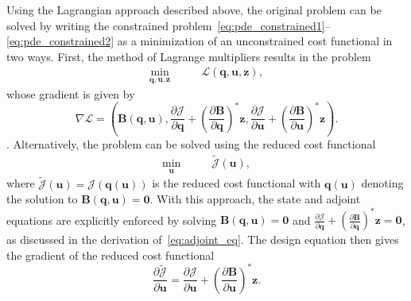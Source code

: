 Using the Lagrangian approach described above, the original problem can be solved by writing the constrained problem~\eqref{eq:pde_constrained1}--\eqref{eq:pde_constrained2} as a minimization of an unconstrained cost functional in two ways. First, the method of Lagrange multipliers results in the problem
\begin{align}
\underset{\mathbf{q}, \mathbf{u}, \mathbf{z}}{\textrm{min}} &\qquad \mathcal{L}(\mathbf{q},\mathbf{u}, \mathbf{z}),
\end{align}
whose gradient is given by
\begin{equation}
\nabla \mathcal{L} = \left(\mathbf{B}(\mathbf{q}, \mathbf{u}), \frac{\partial \mathcal{J}}{\partial \mathbf{q}} + \left(  \frac{\partial \mathbf{B}}{\partial \mathbf{q}}\right)^*\mathbf{z},  \frac{\partial \mathcal{J}}{\partial \mathbf{u}} + \left(  \frac{\partial \mathbf{B}}{\partial \mathbf{u}}\right)^*\mathbf{z} \right).
\end{equation}. 
Alternatively, the problem can be solved using the reduced cost functional
\begin{align}
\underset{\mathbf{u}}{\textrm{min}} &\qquad \tilde{\mathcal{J}}(\mathbf{u}),
\end{align}
where $\tilde{\mathcal{J}}(\mathbf{u}) = \mathcal{J}(\mathbf{q}(\mathbf{u}))$ is the reduced cost functional with $\mathbf{q}(\mathbf{u})$ denoting the solution to $\mathbf{B}(\mathbf{q}, \mathbf{u})  = \mathbf{0}$. With this approach, the state and adjoint equations are explicitly enforced by solving $\mathbf{B}(\mathbf{q}, \mathbf{u})  = \mathbf{0}$ and $\frac{\partial \mathcal{J}}{\partial \mathbf{q}} + \left(  \frac{\partial \mathbf{B}}{\partial \mathbf{q}}\right)^*\mathbf{z} = \mathbf{0}$, as discussed in the derivation of~\eqref{eq:adjoint_eq}. The design equation then gives the gradient of the reduced cost functional
\begin{equation}
\frac{\partial \tilde{\mathcal{J}}}{\partial \mathbf{u}} = \frac{\partial \mathcal{J}}{\partial \mathbf{u}} + \left(  \frac{\partial \mathbf{B}}{\partial \mathbf{u}}\right)^*\mathbf{z}.
\end{equation}

